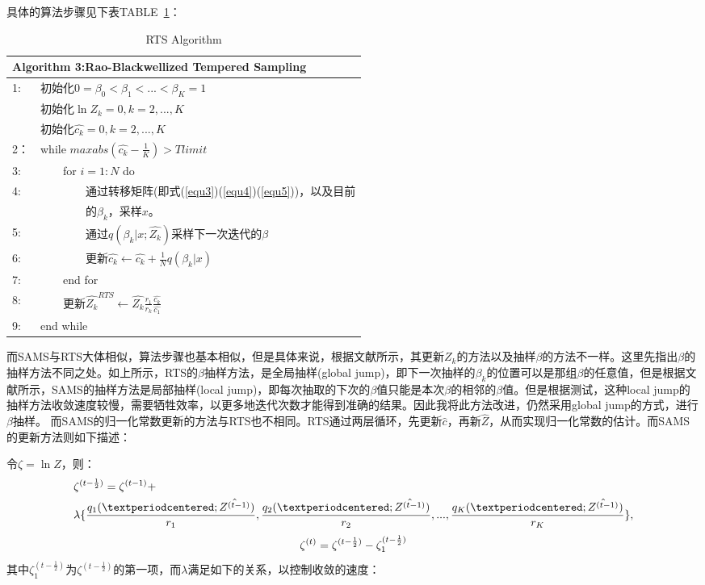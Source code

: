 \documentclass[journal,a4paper]{IEEEtran}
\begin{document}
	具体的算法步骤见下表TABLE~\ref{tab3}：
	\begin{table}[h]
		\begin{tabular}{ll}
			\hline
			\multicolumn{2}{l}{\textbf{Algorithm 3:}Rao-Blackwellized Tempered Sampling} \\
			\hline
			1: & 初始化$ 0=\beta_0<\beta_1<...<\beta_K=1$\\
			   & 初始化$\ln Z_k=0,k=2,...,K$ \\
			   & 初始化$\hat{c_k}=0,k=2,...,K$ \\
			2：& while $max{abs(\hat{c_k}-\frac{1}{K})}>Tlimit$\\
			3: & ~~~~for $i = 1 : N$ do \\
			4: & ~~~~~~~~通过转移矩阵(即式(\ref{equ3})(\ref{equ4})(\ref{equ5}))，以及目前 \\
			   & ~~~~~~~~的$\beta_k$，采样$x$。\\
			5: & ~~~~~~~~通过$q(\beta_k|x;\hat{Z_k})$采样下一次迭代的$\beta$ \\
			6: & ~~~~~~~~更新$\hat{c_k} \leftarrow \hat{c_k} + \frac{1}{N} q(\beta_k|x)$ \\
			7: & ~~~~end for\\
			8: & ~~~~更新$\hat{Z_k}^{RTS} \leftarrow \hat{Z_k}\frac{r_1}{r_k} \frac{\hat{c_k}}{\hat{c_1}}$ \\
			9: & end while\\

			\hline
		\end{tabular}
		\caption{RTS Algorithm}
		\label{tab3}
	\end{table}

	而SAMS与RTS大体相似，算法步骤也基本相似，但是具体来说，根据文献\cite{tan2015optimally}所示，其更新$Z_k$的方法以及抽样$\beta$的方法不一样。这里先指出$\beta$的抽样方法不同之处。如上所示，RTS的$\beta$抽样方法，是全局抽样(global jump)，即下一次抽样的$\beta_k$的位置可以是那组$\beta$的任意值，但是根据文献\cite{salakhutdinov2009learning}所示，SAMS的抽样方法是局部抽样(local jump)，即每次抽取的下次的$\beta$值只能是本次$\beta$的相邻的$\beta$值。但是根据测试，这种local jump的抽样方法收敛速度较慢，需要牺牲效率，以更多地迭代次数才能得到准确的结果。因此我将此方法改进，仍然采用global jump的方式，进行$\beta$抽样。
	而SAMS的归一化常数更新的方法与RTS也不相同。RTS通过两层循环，先更新$\hat{c}$，再新$\hat{Z}$，从而实现归一化常数的估计。而SAMS的更新方法则如下描述：
	
	令$\zeta = \ln Z$，则：
	\begin{align}
		& \zeta^{(t-\frac{1}{2})} = \zeta^{(t-1)} + \notag \\ 
		& \lambda\{\frac{q_1(·;\hat{Z^{(t-1)}})}{r_1},\frac{q_2(·;\hat{Z^{(t-1)}})}{r_2},...,\frac{q_K(·;\hat{Z^{(t-1)}})}{r_K}\},
	\end{align}
	\begin{equation}
		\zeta^{(t)} = \zeta^{(t-\frac{1}{2})} - \zeta_1^{(t-\frac{1}{2})} \notag
	\end{equation}
	其中$\zeta_1^{(t-\frac{1}{2})}$为$\zeta^{(t-\frac{1}{2})}$的第一项，而$\lambda$满足如下的关系，以控制收敛的速度：
	
\end{document}
